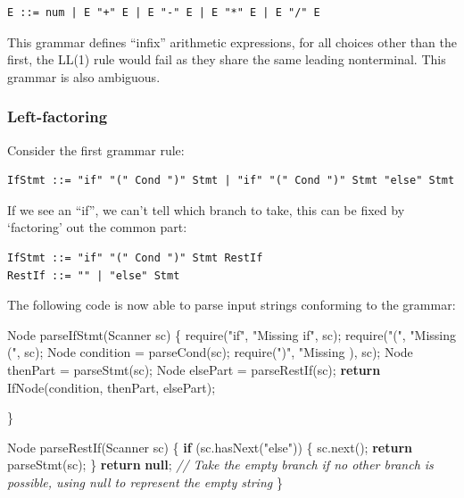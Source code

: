 \documentclass[
]{book}
\newenvironment{Shaded}{\begin{snugshade}}{\end{snugshade}}
\newcommand{\BuiltInTok}[1]{#1}
\newcommand{\CommentTok}[1]{\textcolor[rgb]{0.56,0.35,0.01}{\textit{#1}}}
\newcommand{\FunctionTok}[1]{\textcolor[rgb]{0.00,0.00,0.00}{#1}}
\newcommand{\KeywordTok}[1]{\textcolor[rgb]{0.13,0.29,0.53}{\textbf{#1}}}
\newcommand{\NormalTok}[1]{#1}
\newcommand{\StringTok}[1]{\textcolor[rgb]{0.31,0.60,0.02}{#1}}
\begin{document}
\begin{verbatim}
E ::= num | E "+" E | E "-" E | E "*" E | E "/" E
\end{verbatim}

This grammar defines ``infix'' arithmetic expressions, for all choices other than the first, the LL(1) rule would fail as they share the same leading nonterminal. This grammar is also ambiguous.

\hypertarget{left-factoring}{%
\subsubsection{Left-factoring}\label{left-factoring}}

Consider the first grammar rule:

\begin{verbatim}
IfStmt ::= "if" "(" Cond ")" Stmt | "if" "(" Cond ")" Stmt "else" Stmt
\end{verbatim}

If we see an ``if'', we can't tell which branch to take, this can be fixed by `factoring' out the common part:

\begin{verbatim}
IfStmt ::= "if" "(" Cond ")" Stmt RestIf
RestIf ::= "" | "else" Stmt
\end{verbatim}

The following code is now able to parse input strings conforming to the grammar:

\begin{Shaded}
\begin{Highlighting}[]
\BuiltInTok{Node} \FunctionTok{parseIfStmt}\NormalTok{(}\BuiltInTok{Scanner}\NormalTok{ sc) \{}
  \FunctionTok{require}\NormalTok{(}\StringTok{"if"}\NormalTok{, }\StringTok{"Missing \textquotesingle{}if\textquotesingle{}"}\NormalTok{, sc);}
  \FunctionTok{require}\NormalTok{(}\StringTok{"("}\NormalTok{, }\StringTok{"Missing \textquotesingle{}(\textquotesingle{}"}\NormalTok{, sc);}
  \BuiltInTok{Node}\NormalTok{ condition = }\FunctionTok{parseCond}\NormalTok{(sc);}
  \FunctionTok{require}\NormalTok{(}\StringTok{")"}\NormalTok{, }\StringTok{"Missing \textquotesingle{})\textquotesingle{}, sc);}
  \BuiltInTok{Node}\NormalTok{ thenPart = }\FunctionTok{parseStmt}\NormalTok{(sc);}
  \BuiltInTok{Node}\NormalTok{ elsePart = }\FunctionTok{parseRestIf}\NormalTok{(sc);}
  \KeywordTok{return} \FunctionTok{IfNode}\NormalTok{(condition, thenPart, elsePart);}
  
\NormalTok{\}}

\BuiltInTok{Node} \FunctionTok{parseRestIf}\NormalTok{(}\BuiltInTok{Scanner}\NormalTok{ sc) \{}
  \KeywordTok{if}\NormalTok{ (sc.}\FunctionTok{hasNext}\NormalTok{(}\StringTok{"else"}\NormalTok{)) \{}
\NormalTok{    sc.}\FunctionTok{next}\NormalTok{();}
    \KeywordTok{return} \FunctionTok{parseStmt}\NormalTok{(sc);}
\NormalTok{  \}}
  \KeywordTok{return} \KeywordTok{null}\NormalTok{; }\CommentTok{// Take the empty branch if no other branch is possible, using null to represent the empty string}
\NormalTok{\}}
\end{Highlighting}
\end{Shaded}
\end{document}
